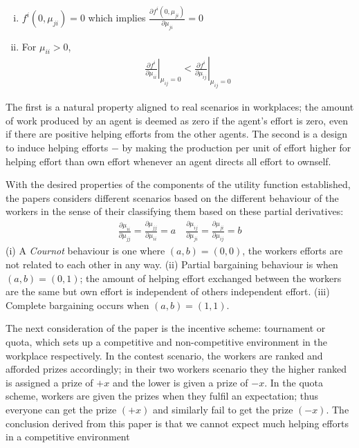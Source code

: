 \documentclass[a4paper,10pt,leqno]{article}
\theoremstyle{definition}
\begin{document}
\begin{enumerate}[(i)]
\item $f^i(0,\mu_{ji})=0$ which implies $\frac{\partial f^i(0,\mu_{ji})}{\partial \mu_{ji}}=0$
\item For $\mu_{ii}>0$,
\begin{align*}
\left.\frac{\partial f^i}{\partial \mu_{ii}}\right|_{\mu_{ij}=0} < \left.\frac{\partial f^i}{\partial \mu_{ij}}\right|_{\mu_{ij}=0}
\end{align*}
\end{enumerate}
The first is a natural property aligned to real scenarios in workplaces; the amount of work produced by an agent is deemed as zero if the agent's effort is zero, even if there are positive helping efforts from the other agents. The second is a design to induce helping efforts $-$ by making the production per unit of effort higher for helping effort than own effort whenever an agent directs all effort to ownself.

With the desired properties of the components of the utility function established,  the papers considers different scenarios based on the different behaviour of the workers in the sense of their classifying them based on these partial derivatives:
\begin{align*}
\frac{\partial\mu_{ii}}{\partial\mu_{jj}}=\frac{\partial\mu_{jj}}{\partial\mu_{ii}}=a\quad
\frac{\partial\mu_{ij}}{\partial\mu_{ji}}=\frac{\partial\mu_{ji}}{\partial\mu_{ij}}=b
\end{align*}
(i) A \emph{Cournot} behaviour is one where $(a,b)=(0,0)$, the workers efforts are not related to each other in any way. (ii) Partial bargaining behaviour is when $(a,b)=(0,1)$; the amount of helping effort exchanged between the workers are the same but own effort is independent of others independent effort. (iii) Complete bargaining occurs when $(a,b)=(1,1)$.


The next consideration of the paper is the incentive scheme: tournament or quota, which sets up a competitive and non-competitive environment in the workplace respectively. In the contest scenario, the workers are ranked and afforded prizes accordingly; in their two workers scenario they the higher ranked is assigned a prize of $+x$ and the lower is given a prize of $-x$. In the quota scheme, workers are given the prizes when they fulfil an expectation; thus everyone can get the prize $(+x)$ and similarly fail to get the prize $(-x)$. The conclusion derived from this paper is that we cannot expect much helping efforts in a competitive environment 
\end{document}
